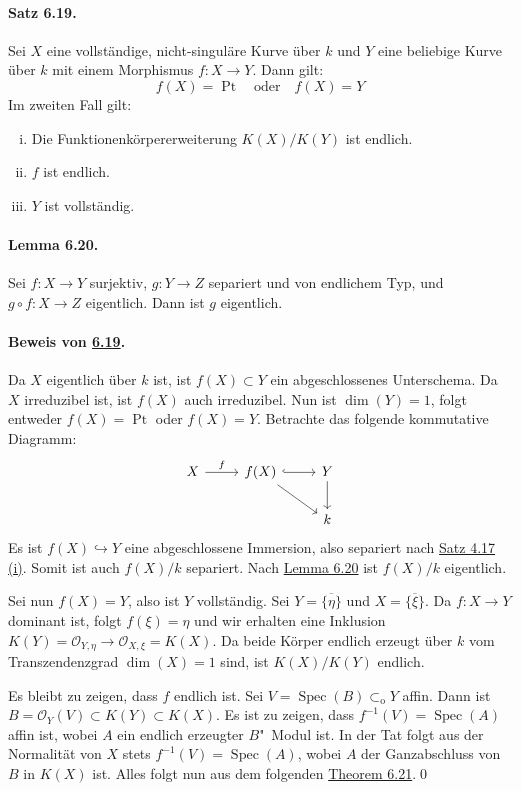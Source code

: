 \paragraph{Satz 6.19.}\label{6.19} Sei $X$ eine vollständige, nicht-singuläre Kurve über $k$ und $Y$ eine beliebige Kurve über $k$ mit einem Morphismus $f:X\to Y$. Dann gilt:
\[f(X)=\operatorname{Pt} \quad\text{oder}\quad f(X)=Y \]
Im zweiten Fall gilt:
\begin{enumerate}[(i)]
\item Die Funktionenkörpererweiterung $K(X)/K(Y)$ ist endlich.
\item $f$ ist endlich.
\item $Y$ ist vollständig.
\end{enumerate}

\paragraph{Lemma 6.20.}\label{6.20} Sei $f:X\to Y$ surjektiv, $g:Y\to Z$ separiert und von endlichem Typ, und $g\circ f:X\to Z$ eigentlich. Dann ist $g$ eigentlich.

\paragraph{Beweis von \hyperref[6.19]{6.19}.} Da $X$ eigentlich über $k$ ist, ist $f(X)\subset Y$ ein abgeschlossenes Unterschema. Da $X$ irreduzibel ist, ist $f(X)$ auch irreduzibel. Nun ist $\dim(Y)=1$, folgt entweder $f(X)=\operatorname{Pt}$ oder $f(X)=Y$. Betrachte das folgende kommutative Diagramm:
\[\begin{tikzcd}
X \rar["f"] & f(X)\rar[hook]\ar[dr] & Y\dar\\
 & & k
\end{tikzcd} \]
Es ist $f(X)\hookrightarrow Y$ eine abgeschlossene Immersion, also separiert nach \hyperref[4.17]{Satz 4.17 (i)}. Somit ist auch $f(X)/ k$ separiert. Nach \hyperref[6.20]{Lemma 6.20} ist $f(X)/k$ eigentlich.

Sei nun $f(X)=Y$, also ist $Y$ vollständig. Sei $Y=\overline{\{\eta\}}$ und $X=\overline{\{\xi\}}$. Da $f:X\to Y$ dominant ist, folgt $f(\xi)=\eta$ und wir erhalten eine Inklusion $K(Y)=\mathcal{O}_{Y,\eta}\to\mathcal{O}_{X,\xi}=K(X)$. Da beide Körper endlich erzeugt über $k$ vom Transzendenzgrad $\dim(X)=1$ sind, ist $K(X)/K(Y)$ endlich.

Es bleibt zu zeigen, dass $f$ endlich ist. Sei $V=\operatorname{Spec}(B)\subset_\text{o}Y$ affin. Dann ist $B=\mathcal{O}_Y(V)\subset K(Y)\subset K(X)$. Es ist zu zeigen, dass $f^{-1}(V)=\operatorname{Spec}(A)$ affin ist, wobei $A$ ein endlich erzeugter $B$"~Modul ist. In der Tat folgt aus der Normalität von $X$ stets $f^{-1}(V)=\operatorname{Spec}(A)$, wobei $A$ der Ganzabschluss von $B$ in $K(X)$ ist. Alles folgt nun aus dem folgenden \hyperref[6.21]{Theorem 6.21}.\qed

